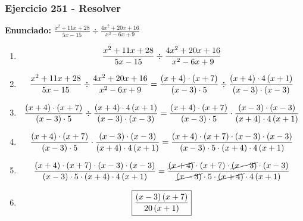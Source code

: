 \documentclass[11pt,a4paper]{article}
\newcommand{\fitmath}[1]{%
\[
\setbox0=\hbox{$\displaystyle #1$}%
\ifdim\wd0>\linewidth
\resizebox{\linewidth}{!}{$\displaystyle #1$}%
\else
#1%
\fi
\]
}
\begin{document}
\subsubsection*{Ejercicio 251 - Resolver}
\textbf{Enunciado:} $ \frac{x^{2} + 11 x + 28}{5 x - 15} \div \frac{4 x^{2} + 20 x + 16}{x^{2} - 6 x + 9} $\par
\begin{enumerate}[leftmargin=2em]
\item \fitmath{\frac{x^{2} + 11 x + 28}{5 x - 15} \div \frac{4 x^{2} + 20 x + 16}{x^{2} - 6 x + 9}}
\item \fitmath{\frac{x^{2} + 11 x + 28}{5 x - 15} \div \frac{4 x^{2} + 20 x + 16}{x^{2} - 6 x + 9}= \frac{\left(x + 4\right)\cdot \left(x + 7\right)}{\left(x - 3\right)\cdot 5} \div \frac{\left(x + 4\right)\cdot 4 \left(x + 1\right)}{\left(x - 3\right)\cdot \left(x - 3\right)}}
\item \fitmath{\frac{\left(x + 4\right)\cdot \left(x + 7\right)}{\left(x - 3\right)\cdot 5}\div \frac{\left(x + 4\right)\cdot 4 \left(x + 1\right)}{\left(x - 3\right)\cdot \left(x - 3\right)}= \frac{\left(x + 4\right)\cdot \left(x + 7\right)}{\left(x - 3\right)\cdot 5}\cdot \frac{\left(x - 3\right)\cdot \left(x - 3\right)}{\left(x + 4\right)\cdot 4 \left(x + 1\right)}}
\item \fitmath{\frac{\left(x + 4\right)\cdot \left(x + 7\right)}{\left(x - 3\right)\cdot 5}\cdot \frac{\left(x - 3\right)\cdot \left(x - 3\right)}{\left(x + 4\right)\cdot 4 \left(x + 1\right)}= \frac{\left(x + 4\right)\cdot \left(x + 7\right)\cdot \left(x - 3\right)\cdot \left(x - 3\right)}{\left(x - 3\right)\cdot 5\cdot \left(x + 4\right)\cdot 4 \left(x + 1\right)}}
\item \fitmath{\frac{\left(x + 4\right)\cdot \left(x + 7\right)\cdot \left(x - 3\right)\cdot \left(x - 3\right)}{\left(x - 3\right)\cdot 5\cdot \left(x + 4\right)\cdot 4 \left(x + 1\right)}= \frac{\cancel{\left(x + 4\right)}\cdot \left(x + 7\right)\cdot \cancel{\left(x - 3\right)}\cdot \left(x - 3\right)}{\cancel{\left(x - 3\right)}\cdot 5\cdot \cancel{\left(x + 4\right)}\cdot 4 \left(x + 1\right)}}
\item \fitmath{\boxed{\frac{\left(x - 3\right) \left(x + 7\right)}{20 \left(x + 1\right)}}}
\end{enumerate}

\vspace{0.12cm}
\end{document}
